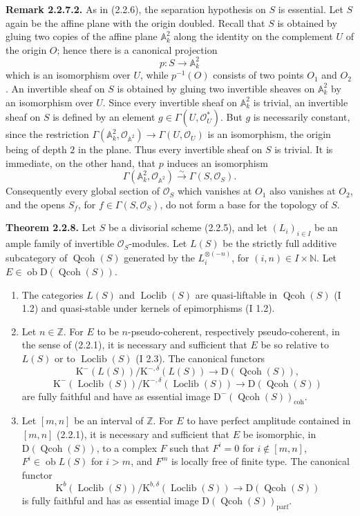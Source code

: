 \documentclass[11pt]{article}
\providecommand{\Loclib}{\operatorname{Loclib}}
\providecommand{\Qcoh}{\operatorname{Qcoh}}
\providecommand{\Ob}{\operatorname{ob}}
\providecommand{\coh}{\operatorname{coh}}
\providecommand{\parf}{\operatorname{parf}}
\begin{document}
\textbf{Remark 2.2.7.2.} As in (2.2.6), the separation hypothesis on $S$ is essential. Let $S$ again be the affine plane with the origin doubled. Recall that $S$ is obtained by gluing two copies of the affine plane $\mathbb A^2_k$ along the identity on the complement $U$ of the origin $O$; hence there is a canonical projection
\[
p:S\longrightarrow\mathbb A^2_k
\]
which is an isomorphism over $U$, while $p^{-1}(O)$ consists of two points $O_1$ and $O_2$. An invertible sheaf on $S$ is obtained by gluing two invertible sheaves on $\mathbb A^2_k$ by an isomorphism over $U$. Since every invertible sheaf on $\mathbb A^2_k$ is trivial, an invertible sheaf on $S$ is defined by an element $g\in\Gamma(U,\mathcal O_U^*)$. But $g$ is necessarily constant, since the restriction $\Gamma(\mathbb A^2_k,\mathcal O_{\mathbb A^2})\to\Gamma(U,\mathcal O_U)$ is an isomorphism, the origin being of depth $2$ in the plane. Thus every invertible sheaf on $S$ is trivial. It is immediate, on the other hand, that $p$ induces an isomorphism
\[
\Gamma(\mathbb A^2_k,\mathcal O_{\mathbb A^2})\xrightarrow{\sim}\Gamma(S,\mathcal O_S).
\]
Consequently every global section of $\mathcal O_S$ which vanishes at $O_1$ also vanishes at $O_2$, and the opens $S_f$, for $f\in\Gamma(S,\mathcal O_S)$, do not form a base for the topology of $S$.

\textbf{Theorem 2.2.8.} Let $S$ be a divisorial scheme (2.2.5), and let $(L_i)_{i\in I}$ be an ample family of invertible $\mathcal O_S$-modules. Let $L(S)$ be the strictly full additive subcategory of $\Qcoh(S)$ generated by the $L_i^{\otimes(-n)}$, for $(i,n)\in I\times\mathbb N$. Let $E\in\Ob\mathrm D(\Qcoh(S))$.
\begin{enumerate}[label=\alph*)]
\item The categories $L(S)$ and $\Loclib(S)$ are quasi-liftable in $\Qcoh(S)$ (I 1.2) and quasi-stable under kernels of epimorphisms (I 1.2).
\item Let $n\in\mathbb Z$. For $E$ to be $n$-pseudo-coherent, respectively pseudo-coherent, in the sense of (2.2.1), it is necessary and sufficient that $E$ be so relative to $L(S)$ or to $\Loclib(S)$ (I 2.3). The canonical functors
\[
\mathrm K^{-}(L(S))/\mathrm K^{-,\delta}(L(S))\longrightarrow \mathrm D(\Qcoh(S)),
\]
\[
\mathrm K^{-}(\Loclib(S))/\mathrm K^{-,\delta}(\Loclib(S))\longrightarrow \mathrm D(\Qcoh(S))
\]
are fully faithful and have as essential image $\mathrm D^{-}(\Qcoh(S))_{\coh}$.
\item Let $[m,n]$ be an interval of $\mathbb Z$. For $E$ to have perfect amplitude contained in $[m,n]$ (2.2.1), it is necessary and sufficient that $E$ be isomorphic, in $\mathrm D(\Qcoh(S))$, to a complex $F$ such that $F^i=0$ for $i\notin[m,n]$, $F^i\in\Ob L(S)$ for $i>m$, and $F^m$ is locally free of finite type. The canonical functor
\[
\mathrm K^b(\Loclib(S))/\mathrm K^{b,\delta}(\Loclib(S))\longrightarrow \mathrm D(\Qcoh(S))
\]
is fully faithful and has as essential image $\mathrm D(\Qcoh(S))_{\parf}$.
\end{enumerate}
\end{document}
